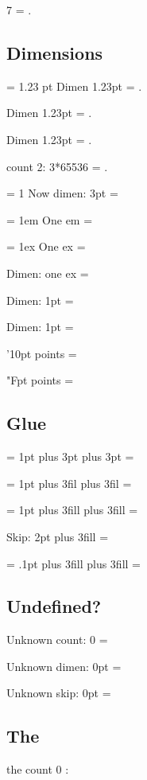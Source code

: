 \documentclass{article}
\begin{document}
7 = \the{}.

\subsection{Dimensions}
= 1.23 pt\relax
Dimen 1.23pt = \the{}.

Dimen 1.23pt = \the\dimen\two.

Dimen 1.23pt = \the\dimen{}.

\relax\multiply{}\relax
count 2: 3*65536 = \the\two.

= 1\relax
Now dimen: 3pt = \the{}

 = 1em\relax
One em = \the{}

 = 1ex\relax
One ex = \the{}

\dimendef{}
Dimen: one ex = \the\dseven

\relax
Dimen: 1pt = \the\dseven

Dimen: 1pt = \the{}

\dseven'10pt points = \the{}

\dseven"Fpt points = \the{}

\subsection{Glue}
 = 1pt plus 3pt\relax
1pt plus 3pt = \the{}

 = 1pt plus 3fil\relax
1pt plus 3fil = \the{}

 = 1pt plus 3fill\relax
1pt plus 3fill = \the{}

\advance{}
Skip: 2pt plus 3fill = \the{}

 = .1pt plus 3fill plus 3fill = \the{}

\subsection{Undefined?}

Unknown count: 0 = \the{}\relax

Unknown dimen: 0pt = \the{}\relax

Unknown skip: 0pt = \the{}\relax

\subsection{The}
the count 0 : \the{}
\end{document}
